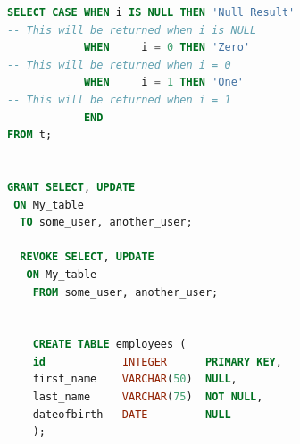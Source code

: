 \begin{lstlisting}[language=SQL]
SELECT CASE WHEN i IS NULL THEN 'Null Result'  
-- This will be returned when i is NULL
            WHEN     i = 0 THEN 'Zero'         
-- This will be returned when i = 0
            WHEN     i = 1 THEN 'One'          
-- This will be returned when i = 1
            END
FROM t;


GRANT SELECT, UPDATE
 ON My_table
  TO some_user, another_user;
   
  REVOKE SELECT, UPDATE
   ON My_table
    FROM some_user, another_user;


    CREATE TABLE employees (
    id            INTEGER      PRIMARY KEY,
    first_name    VARCHAR(50)  NULL,
    last_name     VARCHAR(75)  NOT NULL,
    dateofbirth   DATE         NULL
    );   
\end{lstlisting}

